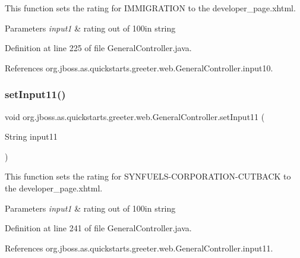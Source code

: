 This function sets the rating for I\+M\+M\+I\+G\+R\+A\+T\+I\+ON to the developer\+\_\+page.\+xhtml. 


\begin{DoxyParams}{Parameters}
{\em input1} & rating out of 100in string \\
\hline
\end{DoxyParams}


Definition at line 225 of file General\+Controller.\+java.



References org.\+jboss.\+as.\+quickstarts.\+greeter.\+web.\+General\+Controller.\+input10.

\mbox{\label{classorg_1_1jboss_1_1as_1_1quickstarts_1_1greeter_1_1web_1_1_general_controller_ae411202f9a59b5d4bf922d410bc717b5}} 
\subsubsection{\texorpdfstring{set\+Input11()}{setInput11()}}
{\footnotesize\ttfamily void org.\+jboss.\+as.\+quickstarts.\+greeter.\+web.\+General\+Controller.\+set\+Input11 (\begin{DoxyParamCaption}\item[{String}]{input11 }\end{DoxyParamCaption})}



This function sets the rating for S\+Y\+N\+F\+U\+E\+L\+S-\/\+C\+O\+R\+P\+O\+R\+A\+T\+I\+O\+N-\/\+C\+U\+T\+B\+A\+CK to the developer\+\_\+page.\+xhtml. 


\begin{DoxyParams}{Parameters}
{\em input1} & rating out of 100in string \\
\hline
\end{DoxyParams}


Definition at line 241 of file General\+Controller.\+java.



References org.\+jboss.\+as.\+quickstarts.\+greeter.\+web.\+General\+Controller.\+input11.

